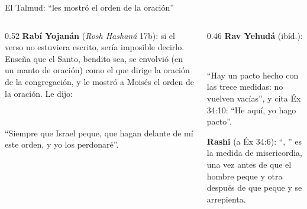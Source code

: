 \begin{frame}{El Talmud: ``les mostró el orden de la oración''}
\begin{columns}[t,onlytextwidth]
\begin{column}{0.52\textwidth}\small
\textbf{Rabí Yojanán} (\emph{Rosh Hashaná} 17b): si el verso no estuviera escrito, sería imposible decirlo. Enseña que el Santo, bendito sea, se envolvió (en un manto de oración) como el que dirige la oración de la congregación, y le mostró a Moisés el orden de la oración. Le dijo:
\begin{center}\\ \end{center}
``Siempre que Israel peque, que hagan delante de mí este orden, y yo los perdonaré''.
\end{column}
\begin{column}{0.46\textwidth}\small
\textbf{Rav Yehudá} (ibíd.):
\begin{center}\\ \end{center}
``Hay un pacto hecho con las trece medidas: no vuelven vacías'', y cita Éx 34:10: ``He aquí, yo hago pacto''.\par\medskip
\textbf{Rashi} (a Éx 34:6): ``\SENOR, \SENOR'' es la medida de misericordia, una vez antes de que el hombre peque y otra después de que peque y se arrepienta.
\end{column}
\end{columns}\par\smallskip
{}
\end{frame}

